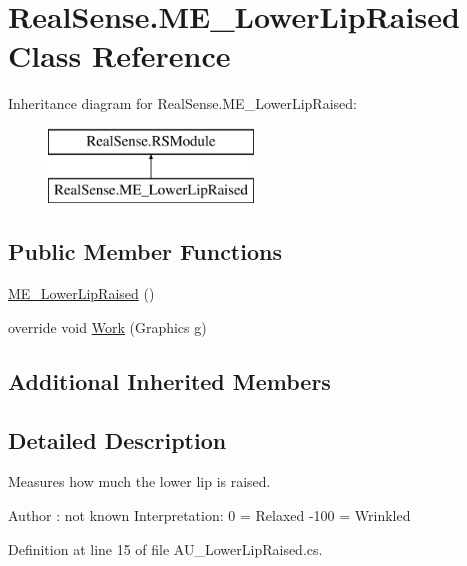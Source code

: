 \hypertarget{class_real_sense_1_1_m_e___lower_lip_raised}{}\section{Real\+Sense.\+M\+E\+\_\+\+Lower\+Lip\+Raised Class Reference}
\label{class_real_sense_1_1_m_e___lower_lip_raised}
Inheritance diagram for Real\+Sense.\+M\+E\+\_\+\+Lower\+Lip\+Raised\+:\begin{figure}[H]
\begin{center}
\leavevmode
\includegraphics[height=2.000000cm]{class_real_sense_1_1_m_e___lower_lip_raised}
\end{center}
\end{figure}
\subsection*{Public Member Functions}
\begin{DoxyCompactItemize}
\item 
\hyperlink{class_real_sense_1_1_m_e___lower_lip_raised_a6e6ca541dd6368c79545a661e2888e41}{M\+E\+\_\+\+Lower\+Lip\+Raised} ()
\item 
override void \hyperlink{class_real_sense_1_1_m_e___lower_lip_raised_a3900212ac8127e35ebc819c34cbd1873}{Work} (Graphics g)
\end{DoxyCompactItemize}
\subsection*{Additional Inherited Members}


\subsection{Detailed Description}
Measures how much the lower lip is raised. \begin{DoxyAuthor}{Author}
\+: not known Interpretation\+: 0 = Relaxed -\/100 = Wrinkled 
\end{DoxyAuthor}


Definition at line 15 of file A\+U\+\_\+\+Lower\+Lip\+Raised.\+cs.



